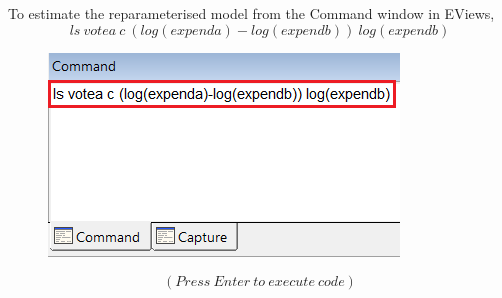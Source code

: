 \documentclass[12pt]{report}
\begin{document}
\newpage
\noindent To estimate the reparameterised model from the Command window in EViews,
$$ls\ votea\ c\ (log(expenda)-log(expendb))\ log(expendb)$$
\begin{figure}[H]
	\centering
	\includegraphics{q1_23}
\end{figure}
\vspace{-\baselineskip}
$$(Press\ Enter\ to\ execute\ code)$$
\end{document}
